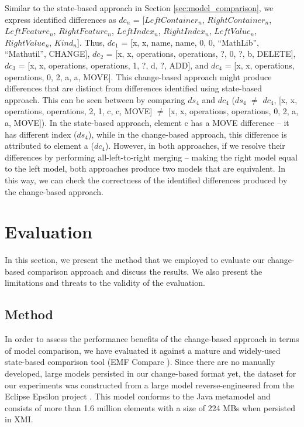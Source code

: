 \documentclass{jot}
\begin{document}
    Similar to the state-based approach in Section \ref{sec:model_comparison}, we express identified differences as $dc_{n}$ = [$LeftContainer_n$, $RightContainer_n$, $LeftFeature_n$, $RightFeature_n$, $LeftIndex_n$, $RightIndex_n$, $LeftValue_n$, $RightValue_n$, $Kind_n$]. Thus, $dc_{1}$ =  [\textsf{x}, \textsf{x}, \textsf{name}, \textsf{name}, 0, 0, ``MathLib'', ``Mathutil'', \textsf{CHANGE}], $dc_{2}$ = [\textsf{x}, \textsf{x}, \textsf{operations}, \textsf{operations}, ?, 0, ?, \textsf{b}, \textsf{DELETE}], $dc_{3}$ = [\textsf{x}, \textsf{x}, \textsf{operations}, \textsf{operations}, 1, ?, \textsf{d}, ?, \textsf{ADD}], and $dc_{4}$ = [\textsf{x}, \textsf{x}, \textsf{operations}, \textsf{operations}, 0, 2, \textsf{a}, \textsf{a}, \textsf{MOVE}]. This change-based approach might produce differences that are distinct from differences identified using state-based approach. This can be seen between by comparing $ds_{4}$ and $dc_{4}$ ($ds_{4}$ $\neq$ $dc_{4}$, [\textsf{x}, \textsf{x}, \textsf{operations}, \textsf{operations}, 2, 1, \textsf{c}, \textsf{c}, \textsf{MOVE}] $\neq$ [\textsf{x}, \textsf{x}, \textsf{operations}, \textsf{operations}, 0, 2, \textsf{a}, \textsf{a}, \textsf{MOVE}]). In the state-based approach, element \textsf{c} has a \textsf{MOVE} difference -- it has different index ($ds_{4}$), while in the change-based approach, this difference is attributed to element \textsf{a} ($dc_{4}$). However, in both approaches, if we resolve their differences by performing all-left-to-right merging  -- making the right model equal to the left model, both approaches produce two models that are equivalent. In this way, we can check the correctness of the identified differences produced by the change-based approach.
    
    \vspace{-10pt}
    \section{Evaluation}
    \label{sec:evaluation}
    In this section, we present the method that we employed to evaluate our change-based comparison approach and discuss the results. We also present the limitations and threats to the validity of the evaluation.
    \subsection{Method}
    \label{sec:method}
    In order to assess the performance benefits of the change-based approach in terms of model comparison, we have evaluated it against a mature and widely-used state-based comparison tool (EMF Compare \cite{emfcompare2018developer,eclipse2017compare}). Since there are no manually developed, large models persisted in our change-based format yet, the dataset for our experiments was constructed from a large model reverse-engineered from the Eclipse Epsilon project \cite{eclipse2018epsilongit,eclipse2017epsilon}. This model conforms to the Java metamodel \cite{eclipse2018modiscojava} and consists of more than 1.6 million elements with a size of 224 MBs when persisted in XMI. 
    
\end{document}
